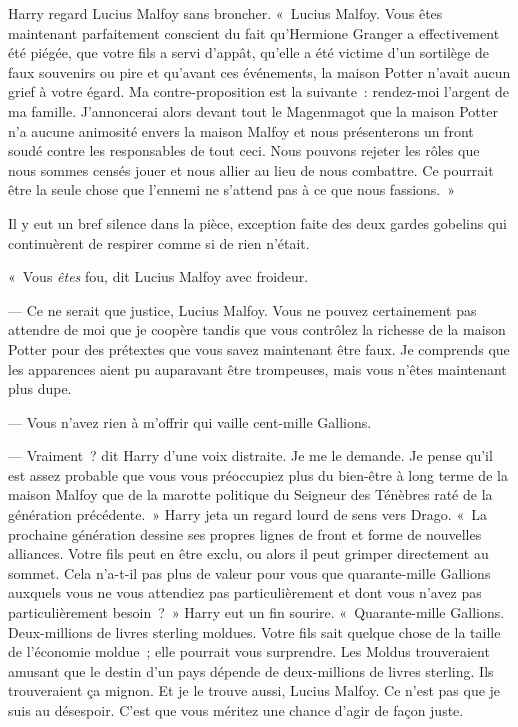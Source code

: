 Harry regard Lucius Malfoy sans broncher. «~Lucius Malfoy. Vous êtes maintenant parfaitement conscient du fait qu'Hermione Granger a effectivement été piégée, que votre fils a servi d'appât, qu'elle a été victime d'un sortilège de faux souvenirs ou pire et qu'avant ces événements, la maison Potter n'avait aucun grief à votre égard. Ma contre-proposition est la suivante~: rendez-moi l'argent de ma famille. J'annoncerai alors devant tout le Magenmagot que la maison Potter n'a aucune animosité envers la maison Malfoy et nous présenterons un front soudé contre les responsables de tout ceci. Nous pouvons rejeter les rôles que nous sommes censés jouer et nous allier au lieu de nous combattre. Ce pourrait être la seule chose que l'ennemi ne s'attend pas à ce que nous fassions.~»

Il y eut un bref silence dans la pièce, exception faite des deux gardes gobelins qui continuèrent de respirer comme si de rien n'était.

«~Vous \emph{êtes} fou, dit Lucius Malfoy avec froideur.

--- Ce ne serait que justice, Lucius Malfoy. Vous ne pouvez certainement pas attendre de moi que je coopère tandis que vous contrôlez la richesse de la maison Potter pour des prétextes que vous savez maintenant être faux. Je comprends que les apparences aient pu auparavant être trompeuses, mais vous n'êtes maintenant plus dupe.

--- Vous n'avez rien à m'offrir qui vaille cent-mille Gallions.

--- Vraiment~? dit Harry d'une voix distraite. Je me le demande. Je pense qu'il est assez probable que vous vous préoccupiez plus du bien-être à long terme de la maison Malfoy que de la marotte politique du Seigneur des Ténèbres raté de la génération précédente.~» Harry jeta un regard lourd de sens vers Drago. «~La prochaine génération dessine ses propres lignes de front et forme de nouvelles alliances. Votre fils peut en être exclu, ou alors il peut grimper directement au sommet. Cela n'a-t-il pas plus de valeur pour vous que quarante-mille Gallions auxquels vous ne vous attendiez pas particulièrement et dont vous n'avez pas particulièrement besoin~?~» Harry eut un fin sourire. «~Quarante-mille Gallions. Deux-millions de livres sterling moldues. Votre fils sait quelque chose de la taille de l'économie moldue~; elle pourrait vous surprendre. Les Moldus trouveraient amusant que le destin d'un pays dépende de deux-millions de livres sterling. Ils trouveraient ça mignon. Et je le trouve aussi, Lucius Malfoy. Ce n'est pas que je suis au désespoir. C'est que vous méritez une chance d'agir de façon juste.

